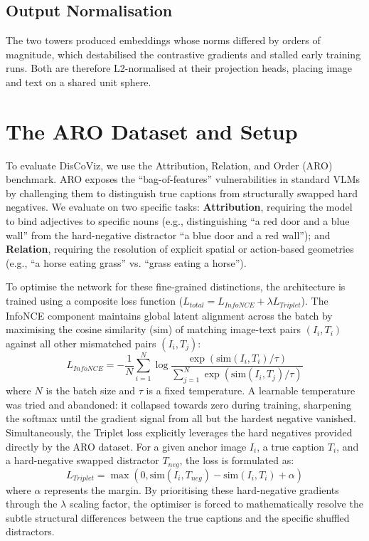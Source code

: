 \documentclass[12pt, a4paper, oneside]{report}
\begin{document}
\subsection{Output Normalisation}
The two towers produced embeddings whose norms differed by orders of magnitude, which destabilised the contrastive gradients and stalled early training runs. Both are therefore L2-normalised at their projection heads, placing image and text on a shared unit sphere.

\section{The ARO Dataset and Setup}

To evaluate DisCoViz, we use the Attribution, Relation, and Order (ARO) benchmark. ARO exposes the ``bag-of-features'' vulnerabilities in standard VLMs by challenging them to distinguish true captions from structurally swapped hard negatives. We evaluate on two specific tasks: \textbf{Attribution}, requiring the model to bind adjectives to specific nouns (e.g., distinguishing ``a red door and a blue wall'' from the hard-negative distractor ``a blue door and a red wall''); and \textbf{Relation}, requiring the resolution of explicit spatial or action-based geometries (e.g., ``a horse eating grass'' vs. ``grass eating a horse'').


To optimise the network for these fine-grained distinctions, the architecture is trained using a composite loss function ($L_{total} = L_{InfoNCE} + \lambda L_{Triplet}$). The InfoNCE component maintains global latent alignment across the batch by maximising the cosine similarity ($\text{sim}$) of matching image-text pairs $(I_i, T_i)$ against all other mismatched pairs $(I_i, T_j)$:
\begin{equation}
    L_{InfoNCE} = - \frac{1}{N} \sum_{i=1}^N \log \frac{\exp(\text{sim}(I_i, T_i) / \tau)}{\sum_{j=1}^N \exp(\text{sim}(I_i, T_j) / \tau)}
\end{equation}
where $N$ is the batch size and $\tau$ is a fixed temperature. A learnable temperature was tried and abandoned: it collapsed towards zero during training, sharpening the softmax until the gradient signal from all but the hardest negative vanished.
Simultaneously, the Triplet loss explicitly leverages the hard negatives provided directly by the ARO dataset. For a given anchor image $I_i$, a true caption $T_i$, and a hard-negative swapped distractor $T_{neg}$, the loss is formulated as:
\begin{equation}
    L_{Triplet} = \max(0, \text{sim}(I_i, T_{neg}) - \text{sim}(I_i, T_i) + \alpha)
\end{equation}
where $\alpha$ represents the margin. By prioritising these hard-negative gradients through the $\lambda$ scaling factor, the optimiser is forced to mathematically resolve the subtle structural differences between the true captions and the specific shuffled distractors.
\end{document}
